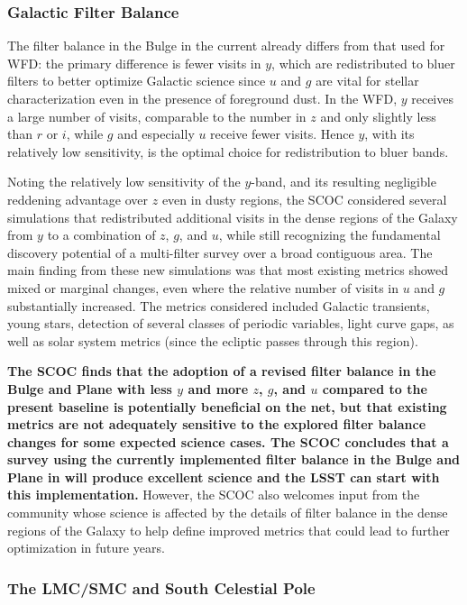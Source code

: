 \subsubsection{Galactic Filter Balance}\label{sec:subG:filterbalance}

The filter balance in the Bulge in the current  already differs from that used for WFD: the primary difference is fewer visits in $y$, which are redistributed to bluer filters to better optimize Galactic science since $u$ and $g$ are vital for stellar characterization even in the presence of foreground dust. In the WFD, $y$ receives a large number of visits, comparable to the number in $z$ and only slightly less than $r$ or $i$, while $g$ and especially $u$ receive fewer visits. Hence $y$, with its relatively low sensitivity, is the optimal choice for redistribution to bluer bands.

Noting the relatively low sensitivity of the $y$-band, and its resulting negligible reddening advantage over $z$ even in dusty regions, the SCOC considered several simulations that redistributed additional visits in the dense regions of the Galaxy from $y$ to a combination of $z$, $g$, and $u$, while still recognizing the fundamental discovery potential of a multi-filter survey over a broad contiguous area. The main finding from these new simulations was that most existing metrics showed mixed or marginal changes, even where the relative number of visits in $u$ and $g$ substantially increased. The metrics considered included Galactic transients, young stars, detection of several classes of periodic variables, light curve gaps, as well as solar system metrics (since the ecliptic passes through this region).

{\bf The SCOC finds that the adoption of a revised filter balance in the Bulge and Plane with less $y$ and more $z$, $g$, and $u$ compared to the present baseline is potentially beneficial on the net, but that existing metrics are not adequately sensitive to the explored filter balance changes for some expected science cases. The SCOC concludes that a survey using the currently implemented filter balance in the Bulge and Plane in  will produce excellent science and the LSST can start with this implementation.} 
However, the SCOC also welcomes input from the community whose science is affected by the details of filter balance in the dense regions of the Galaxy to help define improved metrics that could lead to further optimization in future years.


\subsubsection{The LMC/SMC and South Celestial Pole}\label{sec:subG:specialregions}

